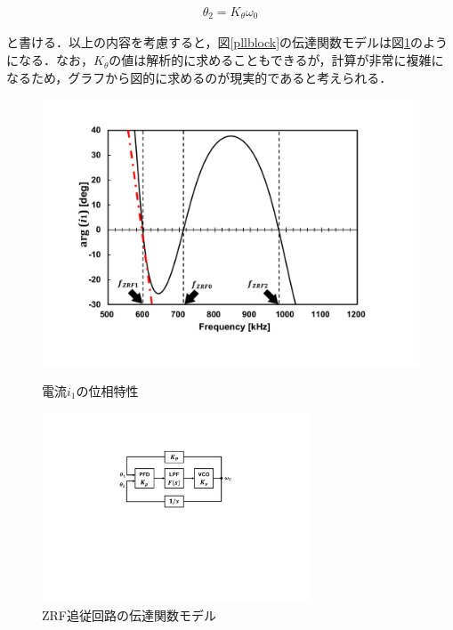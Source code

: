 \begin{align}
\theta_2 = K_\theta \omega_0
\end{align}

と書ける．以上の内容を考慮すると，図\ref{pllblock}の伝達関数モデルは図\ref{pllmodel}のようになる．なお，$K_\theta$の値は解析的に求めることもできるが，計算が非常に複雑になるため，グラフから図的に求めるのが現実的であると考えられる．

\begin{figure}[h]
\begin{center}

\includegraphics[width=120mm]{figures/argi1.pdf}
\caption{電流$i_1$の位相特性}
\label{argi1}

\vspace{5mm}

\includegraphics[width=80mm]{figures/pllmodel.pdf}
\caption{ZRF追従回路の伝達関数モデル}
\label{pllmodel}

\end{center}
\end{figure}

